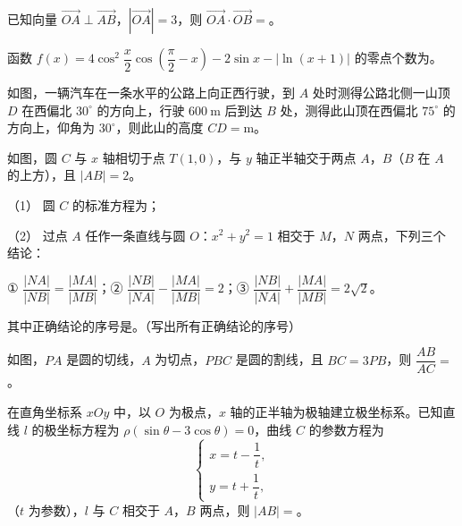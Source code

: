 \begin{question}
已知向量 \(\overrightarrow{OA}\perp\overrightarrow{AB}\)，\(|\overrightarrow{OA}|=3\)，则 \(\overrightarrow{OA}\cdot\overrightarrow{OB}=\)\gkblank{}。

\end{question}
\begin{question}
函数 \(f(x)=4\cos^2\dfrac{x}{2}\cos\left(\dfrac{\pi}{2}-x\right)-2\sin x-|\ln(x+1)|\) 的零点个数为\gkblank{}。

\Needspace{0.4\textheight}
\end{question}
\begin{question}
如图，一辆汽车在一条水平的公路上向正西行驶，到 \(A\) 处时测得公路北侧一山顶 \(D\) 在西偏北 \(30^\circ\) 的方向上，行驶 \(600\ \mathrm{m}\) 后到达 \(B\) 处，测得此山顶在西偏北 \(75^\circ\) 的方向上，仰角为 \(30^\circ\)，则此山的高度 \(CD=\)\gkblank{}\(\mathrm{m}\)。
\nopagebreak[4]
\begin{center}\end{center}
\nopagebreak[4]
\Needspace{0.4\textheight}
\end{question}
\begin{question}
如图，圆 \(C\) 与 \(x\) 轴相切于点 \(T(1,0)\)，与 \(y\) 轴正半轴交于两点 \(A\)，\(B\)（\(B\) 在 \(A\) 的上方），且 \(|AB|=2\)。

（1） 圆 \(C\) 的标准方程为\gkblank{}；

（2） 过点 \(A\) 任作一条直线与圆 \(O\)：\(x^2+y^2=1\) 相交于 \(M\)，\(N\) 两点，下列三个结论：

① \(\dfrac{|NA|}{|NB|}=\dfrac{|MA|}{|MB|}\)；② \(\dfrac{|NB|}{|NA|}-\dfrac{|MA|}{|MB|}=2\)；③ \(\dfrac{|NB|}{|NA|}+\dfrac{|MA|}{|MB|}=2\sqrt2\)。

其中正确结论的序号是\gkblank{}。（写出所有正确结论的序号）
\nopagebreak[4]
\begin{center}\end{center}
\nopagebreak[4]
\Needspace{0.4\textheight}
\end{question}
\begin{question}
如图，\(PA\) 是圆的切线，\(A\) 为切点，\(PBC\) 是圆的割线，且 \(BC=3PB\)，则 \(\dfrac{AB}{AC}=\)\gkblank{}。
\nopagebreak[4]
\begin{center}\end{center}
\nopagebreak[4]
\end{question}
\begin{question}
在直角坐标系 \(xOy\) 中，以 \(O\) 为极点，\(x\) 轴的正半轴为极轴建立极坐标系。已知直线 \(l\) 的极坐标方程为 \(\rho(\sin\theta-3\cos\theta)=0\)，曲线 \(C\) 的参数方程为
\nopagebreak[4]
\[
\begin{cases}
x=t-\dfrac{1}{t},\\[6pt]
y=t+\dfrac{1}{t},
\end{cases}
\]
（\(t\) 为参数），\(l\) 与 \(C\) 相交于 \(A\)，\(B\) 两点，则 \(|AB|=\)\gkblank{}。

\end{question}

